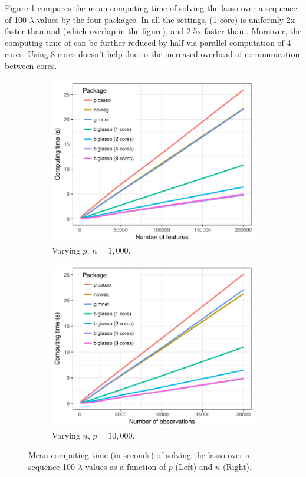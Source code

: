Figure \ref{fig:simu_res} compares the mean computing time of solving the lasso over a sequence of 100 $\lambda$ values by the four packages. In all the settings,  (1 core) is uniformly 2x faster than  and  (which overlap in the figure), and 2.5x faster than . Moreover, the computing time of  can be further reduced by half via parallel-computation of 4 cores. Using 8 cores doesn't help due to the increased overhead of communication between cores.

\begin{figure}[htbp]
\centering
\begin{subfigure}{.5\textwidth}
  \centering
  \includegraphics[width=\linewidth]{Figures/2018-02-27_vary_p_pkgs.pdf}
  \caption{Varying $p$, $n = 1,000$.}
\end{subfigure}%
\begin{subfigure}{.5\textwidth}
  \centering
  \includegraphics[width=\linewidth]{Figures/2018-02-27_vary_n_pkgs.pdf}
  \caption{Varying $n$, $p = 10,000$.}
\end{subfigure}
\caption{Mean computing time (in seconds) of solving the lasso over a sequence 100 $\lambda$ values as a function of $p$ (Left) and $n$ (Right).}
\label{fig:simu_res}
\end{figure}


